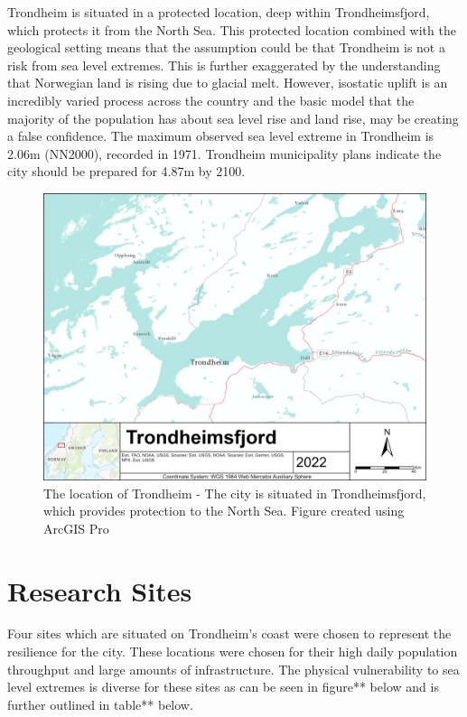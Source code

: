 Trondheim is situated in a protected location, deep within Trondheimsfjord, which protects it from the North Sea. This protected location combined with the geological setting means that the assumption could be that Trondheim is not a risk from sea level extremes. This is further exaggerated by the understanding that Norwegian land is rising due to glacial melt. However, isostatic uplift is an incredibly varied process across the country and the basic model that the majority of the population has about sea level rise and land rise, may be creating a false confidence.  The maximum observed sea level extreme in Trondheim is 2.06m (NN2000), recorded in 1971. Trondheim municipality plans indicate the city should be prepared for 4.87m by 2100. 

\begin{figure}[h!]
    \centering
    \includegraphics[width=1.0\textwidth]{fig/Trondheimsfjord.png}
    \caption{The location of Trondheim - The city is situated in Trondheimsfjord, which provides protection to the North Sea. Figure created using ArcGIS Pro}
    \label{fig:research area Trondheim}
\end{figure}



\section{Research Sites}
Four sites which are situated on Trondheim's coast were chosen to represent the resilience for the city. These locations were chosen for their high daily population throughput and large amounts of infrastructure. The physical vulnerability to sea level extremes is diverse for these sites as can be seen in figure** below and is further outlined in table** below. 
